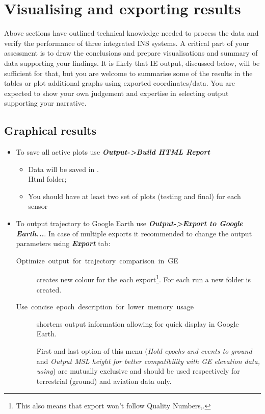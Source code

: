 \documentclass[british]{book}
\begin{document}
\chapter{Visualising and exporting  results\label{sec:Exporting-final-results}}

Above sections have outlined technical knowledge needed to process the data and verify the performance of three integrated INS systems. A critical part of your assessment is to draw the conclusions and prepare visualisations and summary of data supporting your findings. It is likely that IE output, discussed below, will be sufficient for that, but you are welcome to summarise some of the results in the tables or plot additional graphs using exported coordinates/data. You are expected to show your own judgement and expertise in selecting output supporting your narrative.

\section{Graphical results}

\begin{itemize}
	\item To save all active plots use\textbf{\emph{ Output->Build HTML Report }}
	\begin{itemize}
		\item Data will be saved in .\\Html folder;
		\item You should have at least two set of plots (testing and final) for each sensor
	\end{itemize}
	\item To output trajectory to Google Earth use\textbf{\emph{ Output->Export to Google Earth...}}. In case of multiple exports it recommended to change the output parameters using \textbf{\emph{Export}} tab:
	\begin{description}
		\item [{Optimize~output~for~trajectory~comparison~in~GE}] creates new colour for the each export\footnote{This also means that export won't follow Quality Numbers,.}. For each run a new folder is created.
		\item [{Use~concise~epoch~description~for~lower~memory~usage}] shortens output information allowing for quick display in Google Earth.
		\item [] First and last option of this menu (\emph{Hold epochs and events to ground }and \emph{Output MSL height for better compatibility with GE elevation data, using}) are mutually exclusive and should be used respectively for terrestrial (ground) and aviation data only.
	\end{description}
\end{itemize}
\end{document}
